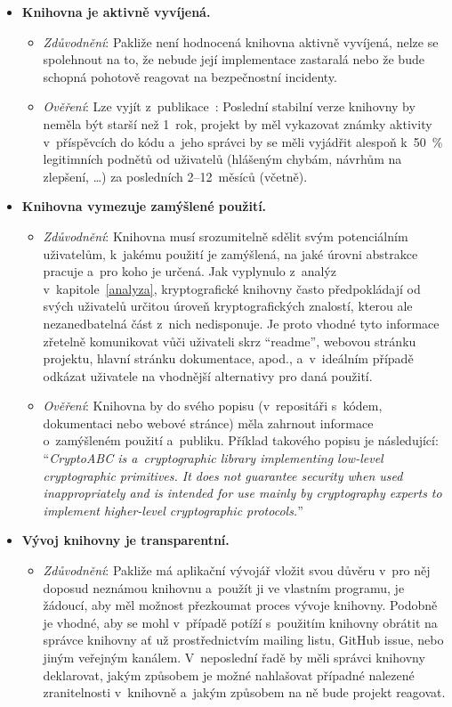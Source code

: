 \begin{itemize}
    \item \textbf{Knihovna je aktivně vyvíjená.} 
    \begin{itemize}[beginpenalty=10000]
        \item \textit{Zdůvodnění}: Pakliže není hodnocená knihovna aktivně vyvíjená, nelze se spolehnout na to, že nebude její implementace zastaralá nebo že bude schopná pohotově reagovat na bezpečnostní incidenty.
        \item \textit{Ověření}: Lze vyjít z~publikace~\cite{concise-guide-eval}: Poslední stabilní verze knihovny by neměla být starší než 1~rok, projekt by měl vykazovat známky aktivity v~příspěvcích do kódu a~jeho správci by se měli vyjádřit alespoň k~50~\% legitimních podnětů od uživatelů (hlášeným chybám, návrhům na zlepšení, \dots) za posledních 2--12~měsíců (včetně).
    \end{itemize}

    \item \textbf{Knihovna vymezuje zamýšlené použití.} 
    \begin{itemize}[beginpenalty=10000]
        \item \textit{Zdůvodnění}: Knihovna musí srozumitelně sdělit svým potenciálním uživatelům, k~jakému použití je zamýšlená, na jaké úrovni abstrakce pracuje a~pro koho je určená. Jak vyplynulo z~analýz v~kapitole~\ref{analyza}, kryptografické knihovny často předpokládají od svých uživatelů určitou úroveň kryptografických znalostí, kterou ale nezanedbatelná část z~nich nedisponuje. Je proto vhodné tyto informace zřetelně komunikovat vůči uživateli skrz ``readme'', webovou stránku projektu, hlavní stránku dokumentace, apod., a~v~ideálním případě odkázat uživatele na vhodnější alternativy pro daná použití.

        \item \textit{Ověření}: Knihovna by do svého popisu (v~repositáři s~kódem, dokumentaci nebo webové stránce) měla zahrnout informace o~zamýšleném použití a~publiku. Příklad takového popisu je následující: ``\textit{CryptoABC is a~cryptographic library implementing low-level cryptographic primitives. It does not guarantee security when used inappropriately and is intended for use mainly by cryptography experts to implement higher-level cryptographic protocols.}''
    \end{itemize}

    \item \textbf{Vývoj knihovny je transparentní.} 
    \begin{itemize}[beginpenalty=10000]
        \item \textit{Zdůvodnění}: Pakliže má aplikační vývojář vložit svou důvěru v~pro něj doposud neznámou knihovnu a~použít ji ve vlastním programu, je žádoucí, aby měl možnost přezkoumat proces vývoje knihovny. Podobně je vhodné, aby se mohl v~případě potíží s~použitím knihovny obrátit na správce knihovny ať už prostřednictvím mailing listu, GitHub issue, nebo jiným veřejným kanálem. V~neposlední řadě by měli správci knihovny deklarovat, jakým způsobem je možné nahlašovat případné nalezené zranitelnosti v~knihovně a~jakým způsobem na ně bude projekt reagovat.


\end{itemize}
\end{itemize}
